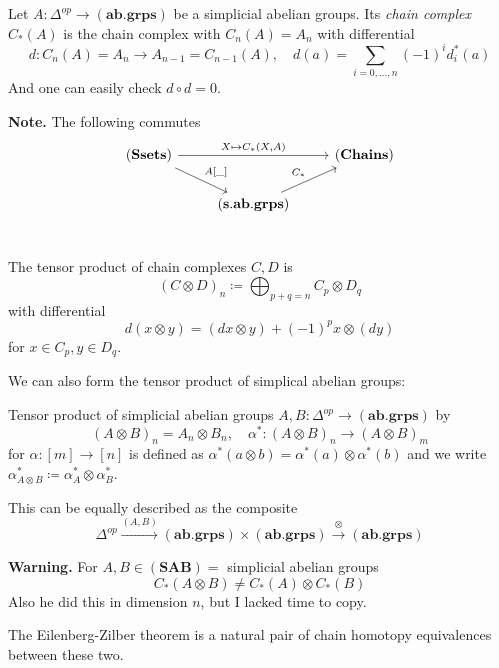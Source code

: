 \documentclass[language=english]{TemplateLecture}
\begin{document}
\begin{construction}
    Let \(A\colon \Delta^{op} \to (\mathbf{ab.grps})\) be a simplicial abelian groups. Its \emph{chain complex} \(C_*(A)\) is the chain complex with \(C_n(A) = A_n\) with differential
    \[d\colon C_n(A) = A_n \to A_{n-1} = C_{n-1}(A), \quad d(a) = \sum_{i = 0, \dots, n} (-1)^{i} d_i^*(a)\]
    And one can easily check \(d\circ d = 0\).
\end{construction}

\textbf{Note.} The following commutes
\[\begin{tikzcd}
    (\mathbf{Ssets}) \ar[rr, "X \mapsto {C_*(X,A)}"] \ar[rd, "{A[\_]}"] & & (\mathbf{Chains}) \\
    & (\mathbf{s.ab.grps}) \ar[ru, "C_*"] \\
\end{tikzcd}\]

\begin{remark}
    The tensor product of chain complexes \(C,D\) is
    \[(C\otimes D)_n \coloneq \bigoplus_{p+q = n} C_p \otimes D_q\]
    with differential
    \[d(x\otimes y) = (dx \otimes y) + (-1)^p x \otimes (dy)\]
    for \(x \in C_p, y \in D_q\).
\end{remark}

    We can also form the tensor product of simplical abelian groups:
\begin{defi}{Tensor product of simplicial abelian groups}{}
    \(A,B \colon \Delta^{op} \to (\mathbf{ab.grps})\) by
    \[(A\otimes B)_n = A_n \otimes B_n, \quad \alpha^*\colon (A\otimes B)_n \to (A\otimes B)_m\]
    for \(\alpha\colon [m] \to [n]\) is defined as \(\alpha^*(a\otimes b) = \alpha^*(a) \otimes \alpha^*(b)\) and we write \(\alpha^*_{A\otimes B} \coloneq \alpha^*_A \otimes \alpha^*_B\).

    This can be equally described as the composite
    \[\Delta^{op}\xrightarrow{(A,B)} (\mathbf{ab.grps})\times (\mathbf{ab.grps}) \xrightarrow{\otimes} (\mathbf{ab.grps})\]
\end{defi}    

\textbf{Warning.} For \(A,B \in (\mathbf{SAB}) = \) simplicial abelian groups
\[C_*(A\otimes B) \neq C_*(A) \otimes C_*(B)\]
Also he did this in dimension \(n\), but I lacked time to copy.

The Eilenberg-Zilber theorem is a natural pair of chain homotopy equivalences between these two.
\end{document}
